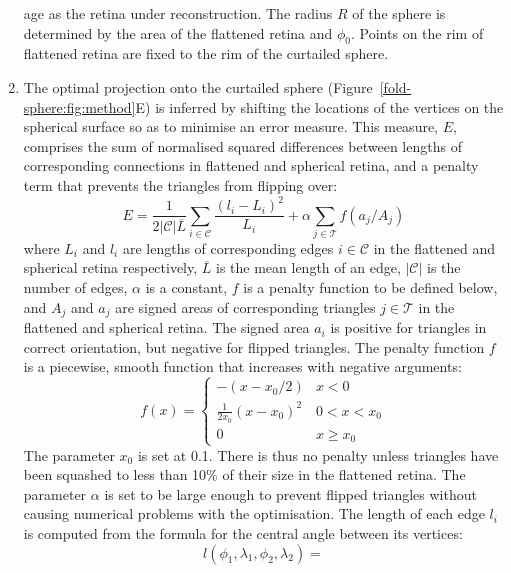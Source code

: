 \documentclass[10pt]{article}
\begin{document}
\begin{enumerate}
  age as the retina under reconstruction. The radius $R$ of the sphere
  is determined by the area of the flattened retina and $\phi_0$.
  Points on the rim of flattened retina are fixed to the rim of the
  curtailed sphere.
\item The optimal projection onto the curtailed sphere
  (Figure~\ref{fold-sphere:fig:method}E) is inferred by shifting the
  locations of the vertices on the spherical surface so as to minimise
  an error measure. This measure, $E$, comprises the sum of normalised
  squared differences between lengths of corresponding connections in
  flattened and spherical retina, and a penalty term that prevents the
  triangles from flipping over:
  \begin{equation}
    E = \frac{1}{2|\mathcal{C}|\overline{L}} \sum_{i\in\mathcal{C}} \frac{(l_i - L_i)^2}{L_i}  
    + \alpha\sum_{j\in\mathcal{T}} f(a_j/A_j)
  \end{equation}
  where $L_i$ and $l_i$ are lengths of corresponding edges
  $i\in\mathcal{C}$ in the flattened and spherical retina
  respectively, $\overline{L}$ is the mean length of an edge,
  $|\mathcal{C}|$ is the number of edges, $\alpha$ is a constant, $f$
  is a penalty function to be defined below, and $A_j$ and $a_j$ are
  signed areas of corresponding triangles $j\in\mathcal{T}$ in the
  flattened and spherical retina.  The signed area $a_i$ is positive
  for triangles in correct orientation, but negative for flipped
  triangles. The penalty function $f$ is a piecewise, smooth function
  that increases with negative arguments:
  \begin{equation}
    \label{retistruct_plos:eq:1}
    f(x) = \left\{
        \begin{array}{ll}
          -(x - x_0/2) & x < 0 \\
          \frac{1}{2x_0}(x - x_0)^2 & 0 < x <x_0 \\
          0 & x \ge x_0
          \end{array} \right.
  \end{equation}
  The parameter $x_0$ is set at 0.1. There is thus no penalty unless
  triangles have been squashed to less than 10\% of their size in the
  flattened retina.  The parameter $\alpha$ is set to be large enough
  to prevent flipped triangles without causing numerical problems with
  the optimisation. The length of each edge $l_i$ is computed from the
  formula for the central angle between its vertices:
  \begin{equation}
    \label{retistruct_plos:eq:2}
    l(\phi_1, \lambda_1, \phi_2, \lambda_2) =

\end{equation}
\end{enumerate}
\end{document}
